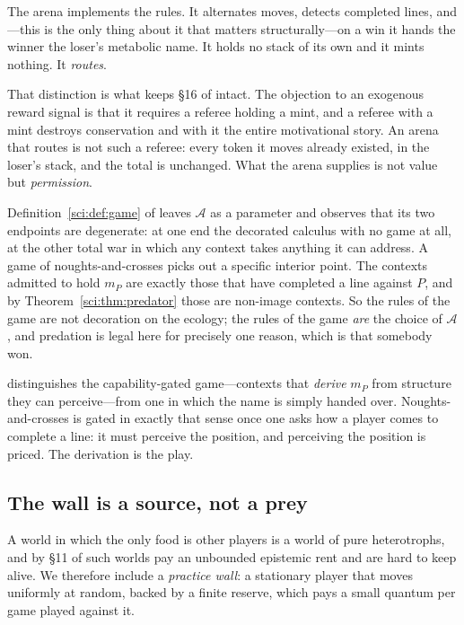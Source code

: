 The arena implements the rules. It alternates moves, detects completed lines,
and---this is the only thing about it that matters structurally---on a win it
hands the winner the loser's metabolic name. It holds no stack of its own and it
mints nothing. It \emph{routes}.

That distinction is what keeps \S16 of \chSci intact. The objection to
an exogenous reward signal is that it requires a referee holding a mint, and a
referee with a mint destroys conservation and with it the entire motivational
story. An arena that routes is not such a referee: every token it moves already
existed, in the loser's stack, and the total is unchanged. What the arena
supplies is not value but \emph{permission}.

\begin{observation}\label{gam:arena-admitted-context-class}
Definition~\ref{sci:def:game} of \chSci leaves $\mathcal{A}$ as a parameter and
observes that its two endpoints are degenerate: at one end the decorated
calculus with no game at all, at the other total war in which any context takes
anything it can address. A game of noughts-and-crosses picks out a specific
interior point. The contexts admitted to hold $m_P$ are exactly those that have
completed a line against $P$, and by Theorem~\ref{sci:thm:predator} those are non-image contexts. So
the rules of the game are not decoration on the ecology; the rules of the game
\emph{are} the choice of $\mathcal A$, and predation is legal here for precisely
one reason, which is that somebody won.
\end{observation}

\begin{remark}\label{gam:capability-gating-concretely}
\chSci distinguishes the capability-gated game---contexts that
\emph{derive} $m_P$ from structure they can perceive---from one in which the
name is simply handed over. Noughts-and-crosses is gated in exactly that sense
once one asks how a player comes to complete a line: it must perceive the
position, and perceiving the position is priced. The derivation is the play.
\end{remark}

\subsection{The wall is a source, not a prey}\label{gam:S3.2}

A world in which the only food is other players is a world of pure
heterotrophs, and by \S11 of \chSci such worlds pay an unbounded
epistemic rent and are hard to keep alive. We therefore include a
\emph{practice wall}: a stationary player that moves uniformly at random, backed
by a finite reserve, which pays a small quantum per game played against it.


